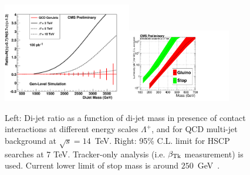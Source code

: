 \documentclass{cmspaper}
\begin{document}
\begin{figure}[htbp] 
\centering
\includegraphics[width=0.5\textwidth]{100pbOptFix.pdf}\includegraphics[width=0.4\textwidth]{HSCP1.pdf}  
\caption{Left: Di-jet ratio as a function of di-jet mass in presence of 
contact interactions at different energy scales $\Lambda^{+}$, 
and for QCD multi-jet background at $\sqrt{s} = 14$~TeV.  
Right: 95\% C.L. limit for HSCP searches at 7 TeV. Tracker-only analysis (i.e. $\beta_{{\rm Tk}}$ measurement) is used. 
Current lower limit of stop mass is around $250$~GeV~\cite{Abazov:2008quETAaltonen:2009kea}.}
\label{fig:DiJetRatioAndHSCP}
\end{figure}
\end{document}
